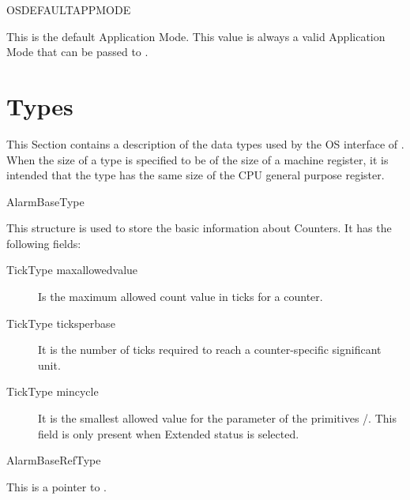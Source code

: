\begin{constant}{OSDEFAULTAPPMODE}
  \begin{constantdescription}
    This is the default Application Mode. This value is always a valid
    Application Mode that can be passed to .
  \end{constantdescription}
\end{constant}


\pagebreak




\section{Types}
\label{sec:types}

This Section contains a description of the data types used by the OS
interface of \ee. When the size of a type is specified to be of the
size of a machine register, it is intended that the type has the same
size of the CPU general purpose register.

\begin{type}{AlarmBaseType}
  \begin{typedescription}
    This structure is used to store the basic information about
    Counters. It has the following fields:
    \begin{description}
    \item[TickType maxallowedvalue] Is the maximum allowed count value
      in ticks for a counter.
    \item[TickType ticksperbase] It is the number of ticks required to
      reach a counter-specific significant unit.
    \item[TickType mincycle] It is the smallest allowed value for the
       parameter of the primitives 
      /. This field is only
      present when Extended status is selected.
    \end{description}
  \end{typedescription}
\end{type}

\begin{type}{AlarmBaseRefType}
  \begin{typedescription}
    This is a pointer to .
  \end{typedescription}
\end{type}



